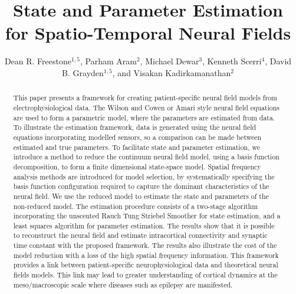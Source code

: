 \documentclass[twocolumn,11pt,a4paper]{article}		%
\begin{document}

\title[State and Parameter Estimation for Spatio-Temporal Neural Fields]{State and Parameter Estimation for Spatio-Temporal Neural Fields}

\author{Dean R. Freestone$^{1,5}$, Parham Aram$^2$, Michael Dewar$^3$, Kenneth Scerri$^4$, David B. Grayden$^{1,5}$, and Visakan Kadirkamanathan$^2$}


\begin{abstract}
	This paper presents a framework for creating patient-specific neural field models from electrophysiological data. The Wilson and Cowen or Amari style neural field equations are used to form a parametric model, where the parameters are estimated from data. To illustrate the estimation framework, data is generated using the neural field equations incorporating modelled sensors, so a comparison can be made between estimated and true parameters. To facilitate state and parameter estimation, we introduce a method to reduce the continuum neural field model, using a basis function decomposition, to form a finite dimensional state-space model. Spatial frequency analysis methods are introduced for model selection, by systematically specifying the basis function configuration required to capture the dominant characteristics of the neural field. We use the reduced model to estimate the state and parameters of the non-reduced model. The estimation procedure consists of a two-stage algorithm incorporating the unscented Rauch Tung Striebel Smoother for state estimation, and a least squares algorithm for parameter estimation. The results show that it is possible to reconstruct the neural field and estimate intracortical connectivity and synaptic time constant with the proposed framework. The results also illustrate the cost of the model reduction with a loss of the high spatial frequency information. This framework provides a link between patient-specific neurophysiological data and theoretical neural fields models. This link may lead to greater understanding of cortical dynamics at the meso/macroscopic scale where diseases such as epilepsy are manifested.   
\end{abstract}
\end{document}
